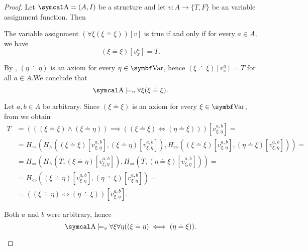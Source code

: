 \begin{proof}
  Let \( \CA = (A, I) \) be a structure and let \( v: A \to \{ T, F \} \) be an variable assignment function. Then

  \begin{description}
     The variable assignment \( (\forall \xi (\xi \doteq \xi))[v] \) is true if and only if for every \( a \in A \), we have
    \begin{equation*}
      (\xi \doteq \xi)[v_x^a] = T.
    \end{equation*}

    By , \( (\eta \doteq \eta) \) is an axiom for every \( \eta \in \Bold{Var} \), hence \mbox{\( (\xi \doteq \xi)[v_x^a] = T \)} for all \( a \in A \).We conclude that
    \begin{equation*}
      \CA \models_v \forall \xi (\xi \doteq \xi).
    \end{equation*}

     Let \( a, b \in A \) be arbitrary. Since \( (\xi \doteq \xi) \) is an axiom for every \( \xi \in \Bold{Var} \), from  we obtain
    \begin{align*}
      T &=
      (((\xi \doteq \xi) \land (\xi \doteq \eta)) \implies ((\xi \doteq \xi) \iff (\eta \doteq \xi)))[v_{\xi,\eta}^{a,b}]
      = \\ &=
      H_\Rightarrow(H_\land((\xi \doteq \xi)[v_{\xi,\eta}^{a,b}], (\xi \doteq \eta)[v_{\xi,\eta}^{a,b}]), H_\Leftrightarrow((\xi \doteq \xi)[v_{\xi,\eta}^{a,b}], (\eta \doteq \xi)[v_{\xi,\eta}^{a,b}]))
      = \\ &=
      H_\Rightarrow(H_\land(T, (\xi \doteq \eta)[v_{\xi,\eta}^{a,b}]), H_\Leftrightarrow(T, (\eta \doteq \xi)[v_{\xi,\eta}^{a,b}]))
      = \\ &=
      H_\Leftrightarrow((\xi \doteq \eta)[v_{\xi,\eta}^{a,b}], (\eta \doteq \xi)[v_{\xi,\eta}^{a,b}])
      = \\ &=
      ((\xi \doteq \eta) \iff (\eta \doteq \xi))[v_{\xi,\eta}^{a,b}].
    \end{align*}

    Both \( a \) and \( b \) were arbitrary, hence
    \begin{equation*}
      \CA \models_v \forall \xi \forall \eta ((\xi \doteq \eta) \iff (\eta \doteq \xi)).
    \end{equation*}


\end{description}
\end{proof}
